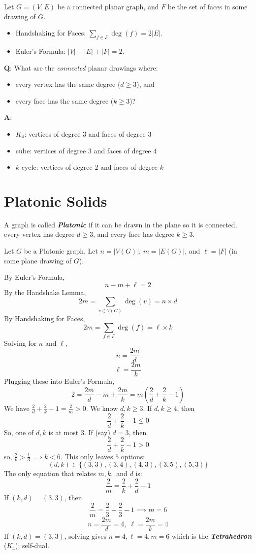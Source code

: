 Let $ G=(V,E) $ be a connected planar graph, and $ F $ be the set of faces
in some drawing of $ G $.
\begin{itemize}
    \item Handshaking for Faces: $ \sum\limits_{f\in F}\deg(f)=2|E| $.
    \item Euler's Formula: $ |V|-|E|+|F|=2 $.
\end{itemize}

\textbf{Q}: What are the \emph{connected} planar drawings where:
\begin{itemize}
    \item every vertex has the same degree ($ d\geqslant 3 $), and
    \item every face has the same degree ($ k\geqslant 3 $)?
\end{itemize}

\textbf{A}:
\begin{itemize}
    \item $ K_4 $: vertices of degree $ 3 $ and faces of degree $ 3 $
    \item cube: vertices of degree $ 3 $ and faces of degree $ 4 $
    \item $ k $-cycle: vertices of degree $ 2 $ and faces of degree $ k $
\end{itemize}

\section{Platonic Solids}
\begin{defbox}
    \begin{definition}
        A graph is called \textbf{\emph{Platonic}} if it can be drawn in
        the plane so it is connected, every vertex has degree
        $ d\geqslant 3 $, and every face has degree $ k\geqslant 3 $.
    \end{definition}
\end{defbox}

Let $ G $ be a Platonic graph. Let $ n=|V(G)| $, $ m=|E(G)| $,
and $ \ell=|F| $ (in some plane drawing of $ G $).

By Euler's Formula,
\[ n-m+\ell=2 \]
By the Handshake Lemma,
\[ 2m=\sum\limits_{v\in V(G)}\deg(v)=n\times d \]
By Handshaking for Faces,
\[ 2m=\sum\limits_{f\in F}\deg(f)=\ell\times k \]
Solving for $ n $ and $ \ell $,
\[ n=\frac{2m}{d} \]
\[ \ell=\frac{2m}{k} \]
Plugging these into Euler's Formula,
\[ 2=\frac{2m}{d}-m+\frac{2m}{k}=m\left(\frac{2}{d}+\frac{2}{k}-1\right) \]
We have $ \frac{2}{d} +\frac{2}{k} -1=\frac{2}{m} >0 $.
We know $ d,k\geqslant 3 $. If $ d,k\geqslant 4 $, then
\[ \frac{2}{d} + \frac{2}{k} - 1\leqslant 0 \]
So, one of $ d,k $ is at most $ 3 $. If (say) $ d=3 $, then
\[ \frac{2}{d} +\frac{2}{k} -1>0 \]
so, $ \frac{2}{k} >\frac{1}{3} \implies k<6 $. This
only leaves $ 5 $ options:
\[ (d,k)\in \{(3,3),(3,4),(4,3),(3,5),(5,3)\} \]
The only equation that relates $ m,k, $ and $ d $ is:
\[ \frac{2}{m} = \frac{2}{k} +\frac{2}{d} -1 \]
If $ (k,d)=(3,3) $, then
\[ \frac{2}{m} =\frac{2}{3} +\frac{2}{3} -1\implies m=6 \]
\[ n=\frac{2m}{d} =4,\; \ell=\frac{2m}{k} =4 \]
If $ (k,d)=(3,3) $, solving gives $ n=4,\ell=4,m=6 $ which is
the \textbf{\emph{Tetrahedron}} ($ K_4 $); self-dual.

